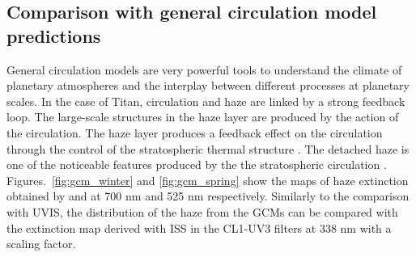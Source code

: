 \subsection{Comparison with general circulation model predictions}

General circulation models are very powerful tools to understand the climate of planetary atmospheres and the
interplay between different processes at planetary scales. In the case of Titan, circulation and haze are linked
by a strong feedback loop. The large-scale structures in the haze layer are produced by the action of the
circulation. The haze layer produces a feedback effect on the circulation through the control of the stratospheric
thermal structure \citep{Rannou2004}. The detached haze is one of the noticeable features produced by the the
stratospheric circulation \citep{Rannou2002, Lebonnois2012, Larson2015}. Figures.~\ref{fig:gcm_winter}
and \ref{fig:gcm_spring} show the maps of haze extinction obtained by \cite{Lebonnois2012} and
\cite{Larson2015} at 700 nm and 525 nm respectively.
Similarly to the comparison with UVIS, the distribution of the haze from the GCMs
can be compared with the extinction map derived with ISS in the CL1-UV3 filters at 338 nm with a scaling factor.

\begin{figure*}[!ht]
\caption{Zonally-averaged haze extinction at northern winter solstice
($L_s = \ang{270}$) estimated by \cite{Lebonnois2012} at the wavelength $\lambda = $ 700 nm (a)
and by \cite{Larson2015} at $\lambda = $ 525 nm (b). (c) Haze extinction map
retrieved from Cassini/ISS observation CL1-UV3 ($\lambda = $ 338 nm) in the middle of winter
(N1477222048\_2 - $L_s = \ang{300}$).}
\label{fig:gcm_winter}
\end{figure*}

